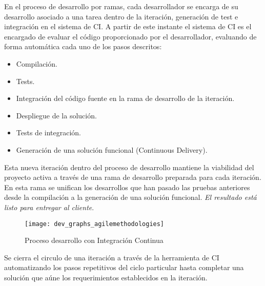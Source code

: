 \par En el proceso de desarrollo por ramas, cada desarrollador se encarga de su desarrollo asociado a una tarea dentro de la iteración, generación de test e integración en el sistema de CI. A partir de este instante el sistema de CI es el encargado de evaluar el código proporcionado por el desarrollador, evaluando de forma automática cada uno de los pasos descritos:

\begin{itemize}
	\item Compilación.
	\item Tests.
	\item Integración del código fuente en la rama de desarrollo de la iteración.
	\item Despliegue de la solución.
	\item Tests de integración.
	\item Generación de una solución funcional (Continuous Delivery).
\end{itemize}

\par Esta nueva iteración dentro del proceso de desarrollo mantiene la viabilidad del proyecto activa a través de una rama de desarrollo preparada para cada iteración. En esta rama se unifican los desarrollos que han pasado las pruebas anteriores desde la compilación a la generación de una solución funcional. \emph{El resultado está listo para entregar al cliente}.

\begin{figure}[H]
    \centering
    \texttt{[image: dev\_graphs\_agilemethodologies]}
    \caption{Proceso desarrollo con Integración Continua}
    \label{fig:dev_graphs_agilemethodologies}
\end{figure}

\par Se cierra el circulo de una iteración a través de la herramienta de CI automatizando los pasos repetitivos del ciclo particular hasta completar una solución que aúne los requerimientos establecidos en la iteración.



